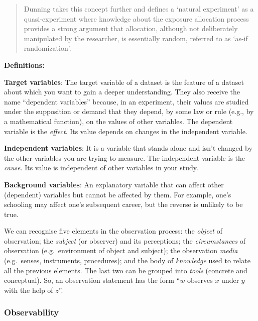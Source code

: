 \documentclass[
  12pt,
]{book}
\begin{document}
\begin{quote}
Dunning takes this concept further and defines a `natural experiment' as a quasi-experiment where knowledge about the exposure allocation process provides a strong argument that allocation, although not deliberately manipulated by the researcher, is essentially random, referred to as `as-if randomization'. --- \citep{de2021conceptualising}
\end{quote}

\begin{tipbox}

\textbf{Definitions:}

\textbf{Target variables}: The target variable of a dataset is the feature of a dataset about which you want to gain a deeper understanding. They also receive the name ``dependent variables'' because, in an experiment, their values are studied under the supposition or demand that they depend, by some law or rule (e.g., by a mathematical function), on the values of other variables. The dependent variable is the \emph{effect}. Its value depends on changes in the independent variable.

\textbf{Independent variables}: It is a variable that stands alone and isn't changed by the other variables you are trying to measure. The independent variable is the \emph{cause}. Its value is independent of other variables in your study.

\textbf{Background variables}: An explanatory variable that can affect other (dependent) variables but cannot be affected by them. For example, one's schooling may affect one's subsequent career, but the reverse is unlikely to be true.

\end{tipbox}

We can recognise five elements in the observation process: the \emph{object} of observation; the \emph{subject} (or observer) and its perceptions; the \emph{circumstances} of observation (e.g.~environment of object and subject); the observation \emph{media} (e.g.~senses, instruments, procedures); and the body of \emph{knowledge} used to relate all the previous elements. The last two can be grouped into \emph{tools} (concrete and conceptual). So, an observation statement has the form ``\(w\) observes \(x\) under \(y\) with the help of \(z\)''. \citep{bunge2017philosophy}

\subsubsection{Observability}\label{observability}
\end{document}
